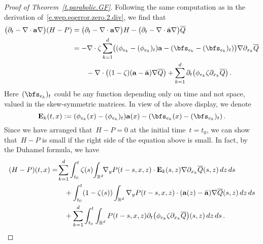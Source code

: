 \documentclass[11pt,twoside]{article} %
\numberwithin{equation}{section}
\theoremstyle{definition}
\newcommand*{\Rd}{\ensuremath{\mathbb{R}^d}}
\renewcommand{\a}{\mathbf{a}}
\newcommand{\ahom}{\bar{\a}}
\begin{document}
\begin{proof}[{Proof of Theorem~\ref{t.parabolic.GF}}]
Following the same computation as in the derivation of~\eqref{e.wep.eqerror.zero.2.div}, we find that 
\begin{align*}
\bigl( \partial_t - \nabla \cdot \a\nabla\bigr) (H-P) 
&
=
\bigl( \partial_t - \nabla \cdot \a\nabla\bigr) H 
-
\bigl( \partial_t - \nabla \cdot \ahom\nabla\bigr) \overline{Q}
\notag \\ & 
=
-\nabla \cdot \zeta \sum_{k=1}^d 
\bigl( (\phi_{e_k} - (\phi_{e_k})_t)  \a   - (\bfs_{e_k} - (\bfs_{e_k})_t ) \bigr) \nabla \partial_{x_k} \overline{Q} 
\notag  \\ & \qquad 
-
\nabla \cdot \bigl( (1-\zeta)(\a  - \ahom) \nabla \overline{Q}  \bigr)
+
\sum_{k=1}^d
  \partial_t \bigl( \phi_{e_k} \zeta \partial_{x_k}  \overline{Q}\bigr)
\,.
\end{align*}
Here~$(\bfs_{e_k})_t$ could be any function depending only on time and not space, valued in the skew-symmetric matrices. 
In view of the above display, we denote 
\begin{equation*}  
\mathbf{E}_k(t,x) :=  (\phi_{e_k}(x) - (\phi_{e_k})_t)  \a(x)   - (\bfs_{e_k}(x) - (\bfs_{e_k})_t )\,.
\end{equation*}
Since we have arranged that~$H - P = 0$ at the initial time~$t=t_0$, 
we can show that~$H-P$ is small if the right side of the equation above is small. In fact, by the Duhamel formula, we have
\begin{align}
\label{e.identity.HP}
(H-P)(t,x)
&
= 
\! \sum_{k=1}^d
\int_{t_0}^{t}
\zeta(s) \!
\int_{\Rd}  \!\!
\nabla_y P(t-s,x,z) 
\cdot
\mathbf{E}_k(s,z)\nabla \partial_{x_k} \overline{Q} (s,z)\,dz\,ds
\notag \\ & \qquad 
+
\int_{t_0}^{t}
(1-\zeta(s))
\int_{\Rd} 
\nabla_y P(t-s,x,z) 
\cdot (\a(z)-\ahom) \nabla\overline{Q}(s,z)\,dz\,ds
\notag \\ & \qquad 
+
\sum_{k=1}^d
\int_{t_0}^{t}
\int_{\Rd}
P(t-s,x,z) \partial_t \bigl( \phi_{e_k} \zeta \partial_{x_k}  \overline{Q}\bigr) (s,z)
\,dz\,ds
\,.
\end{align}



\end{proof}
\end{document}
